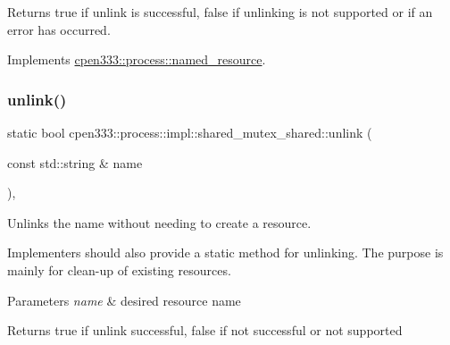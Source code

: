 \begin{DoxyReturn}{Returns}
{\ttfamily true} if unlink is successful, {\ttfamily false} if unlinking is not supported or if an error has occurred. 
\end{DoxyReturn}


Implements \hyperlink{classcpen333_1_1process_1_1named__resource_a5d33168fee48c9b0c58ab8fd96e230ce}{cpen333\+::process\+::named\+\_\+resource}.

\mbox{\label{classcpen333_1_1process_1_1impl_1_1shared__mutex__shared_a855882d87dd04246229b624179837030}} 
\subsubsection{\texorpdfstring{unlink()}{unlink()}\hspace{0.1cm}{\footnotesize\ttfamily [2/2]}}
{\footnotesize\ttfamily static bool cpen333\+::process\+::impl\+::shared\+\_\+mutex\+\_\+shared\+::unlink (\begin{DoxyParamCaption}\item[{const std\+::string \&}]{name }\end{DoxyParamCaption})\hspace{0.3cm}{\ttfamily [inline]}, {\ttfamily [static]}}



Unlinks the name without needing to create a resource. 

Implementers should also provide a static method for unlinking. The purpose is mainly for clean-\/up of existing resources.


\begin{DoxyParams}{Parameters}
{\em name} & desired resource name \\
\hline
\end{DoxyParams}
\begin{DoxyReturn}{Returns}
{\ttfamily true} if unlink successful, {\ttfamily false} if not successful or not supported 
\end{DoxyReturn}
\mbox{\label{classcpen333_1_1process_1_1impl_1_1shared__mutex__shared_aa5a87d5886497263cc6b0f0a4d79f15c}} 
